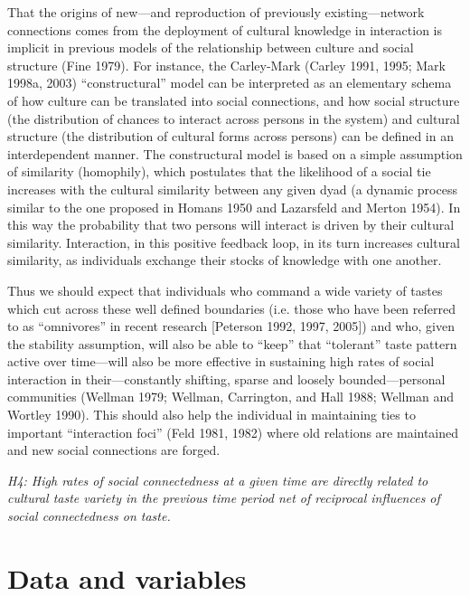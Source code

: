 \documentclass[
]{article}
\begin{document}
That the origins of new---and reproduction of previously existing---network connections comes from the deployment of cultural knowledge in interaction is implicit in previous models of the relationship between culture and social structure (Fine 1979). For instance, the Carley-Mark (Carley 1991, 1995; Mark 1998a, 2003) ``constructural'' model can be interpreted as an elementary schema of how culture can be translated into social connections, and how social structure (the distribution of chances to interact across persons in the system) and cultural structure (the distribution of cultural forms across persons) can be defined in an interdependent manner. The constructural model is based on a simple assumption of similarity (homophily), which postulates that the likelihood of a social tie increases with the cultural similarity between any given dyad (a dynamic process similar to the one proposed in Homans 1950 and Lazarsfeld and Merton 1954). In this way the probability that two persons will interact is driven by their cultural similarity. Interaction, in this positive feedback loop, in its turn increases cultural similarity, as individuals exchange their stocks of knowledge with one another.

Thus we should expect that individuals who command a wide variety of tastes which cut across these well defined boundaries (i.e. those who have been referred to as ``omnivores'' in recent research {[}Peterson 1992, 1997, 2005{]}) and who, given the stability assumption, will also be able to ``keep'' that ``tolerant'' taste pattern active over time---will also be more effective in sustaining high rates of social interaction in their---constantly shifting, sparse and loosely bounded---personal communities (Wellman 1979; Wellman, Carrington, and Hall 1988; Wellman and Wortley 1990). This should also help the individual in maintaining ties to important ``interaction foci'' (Feld 1981, 1982) where old relations are maintained and new social connections are forged.

\emph{H4: High rates of social connectedness at a given time are directly related to cultural taste variety in the previous time period net of reciprocal influences of social connectedness on taste.}

\section{Data and variables}\label{data-and-variables}
\end{document}
